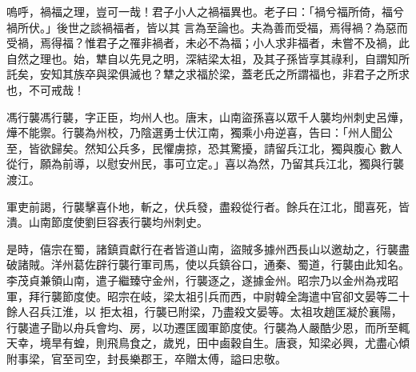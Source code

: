 \begin{pinyinscope}
 嗚呼，禍福之理，豈可一哉！君子小人之禍福異也。老子曰：「禍兮福所倚，福兮禍所伏。」後世之談禍福者，皆以其
 言為至論也。夫為善而受福，焉得禍？為惡而受禍，焉得福？惟君子之罹非禍者，未必不為福；小人求非福者，未嘗不及禍，此自然之理也。始，犨自以先見之明，深結梁太祖，及其子孫皆享其祿利，自謂知所託矣，安知其族卒與梁俱滅也？犨之求福於梁，蓋老氏之所謂福也，非君子之所求也，不可戒哉！



 馮行襲馮行襲，字正臣，均州人也。唐末，山南盜孫喜以眾千人襲均州刺史呂燁，燁不能禦。行襲為州校，乃陰選勇士伏江南，獨乘小舟逆喜，告曰：「州人聞公至，皆欲歸矣。然知公兵多，民懼虜掠，恐其驚擾，請留兵江北，獨與腹心
 數人從行，願為前導，以慰安州民，事可立定。」喜以為然，乃留其兵江北，獨與行襲渡江。



 軍吏前謁，行襲擊喜仆地，斬之，伏兵發，盡殺從行者。餘兵在江北，聞喜死，皆潰。山南節度使劉巨容表行襲均州刺史。



 是時，僖宗在蜀，諸鎮貢獻行在者皆道山南，盜賊多據州西長山以邀劫之，行襲盡破諸賊。洋州葛佐辟行襲行軍司馬，使以兵鎮谷口，通秦、蜀道，行襲由此知名。李茂貞兼領山南，遣子繼臻守金州，行襲逐之，遂據金州。昭宗乃以金州為戎昭軍，拜行襲節度使。昭宗在岐，梁太祖引兵而西，中尉韓全誨遣中官卻文晏等二十餘人召兵江淮，以
 拒太祖，行襲已附梁，乃盡殺文晏等。太祖攻趙匡凝於襄陽，行襲遣子勖以舟兵會均、房，以功遷匡國軍節度使。行襲為人嚴酷少恩，而所至輒天幸，境旱有蝗，則飛鳥食之，歲兇，田中鹵穀自生。唐衰，知梁必興，尤盡心傾附事梁，官至司空，封長樂郡王，卒贈太傅，謚曰忠敬。



\end{pinyinscope}